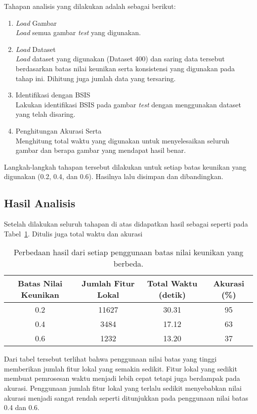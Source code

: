 Tahapan analisis yang dilakukan adalah sebagai berikut:
\begin{enumerate}
	\item \textit{Load} Gambar \\
	\textit{Load} semua gambar \textit{test} yang digunakan.
	\item \textit{Load} Dataset \\
	\textit{Load} dataset yang digunakan (Dataset 400) dan saring data tersebut berdasarkan batas nilai keunikan serta konsistensi yang digunakan pada tahap ini. Dihitung juga jumlah data yang tersaring.
	\item Identifikasi dengan BSIS \\
	Lakukan identifikasi BSIS pada gambar \textit{test} dengan menggunakan dataset yang telah disaring.
	\item Penghitungan Akurasi Serta \\
	Menghitung total waktu yang digunakan untuk menyelesaikan seluruh gambar dan berapa gambar yang mendapat hasil benar.
\end{enumerate}
Langkah-langkah tahapan tersebut dilakukan untuk setiap batas keunikan yang digunakan (0.2, 0.4, dan 0.6). Hasilnya lalu disimpan dan dibandingkan.

\subsection{Hasil Analisis}
Setelah dilakukan seluruh tahapan di atas didapatkan hasil sebagai seperti pada Tabel~\ref{tab:nilai_keunikan}. Ditulis juga total waktu dan akurasi 
\begin{table}[H]
	\centering
	\begin{tabular}{|c|c|c|c|}
		\hline
		Batas Nilai Keunikan & Jumlah Fitur Lokal & Total Waktu (detik) & Akurasi (\%) \\
		\hline
		0.2 & 11627 & 30.31 & 95 \\
		\hline
		0.4 & 3484 & 17.12 & 63 \\
		\hline
		0.6 & 1232 & 13.20 & 37 \\
		\hline
	\end{tabular}
	\caption{Perbedaan hasil dari setiap penggunaan batas nilai keunikan yang berbeda.}
	\label{tab:nilai_keunikan}
\end{table}
Dari tabel tersebut terlihat bahwa penggunaan nilai batas yang tinggi memberikan jumlah fitur lokal yang semakin sedikit. Fitur lokal yang sedikit membuat pemrosesan waktu menjadi lebih cepat tetapi juga berdampak pada akurasi. Penggunaan jumlah fitur lokal yang terlalu sedikit menyebabkan nilai akurasi menjadi sangat rendah seperti ditunjukkan pada penggunaan nilai batas 0.4 dan 0.6.


